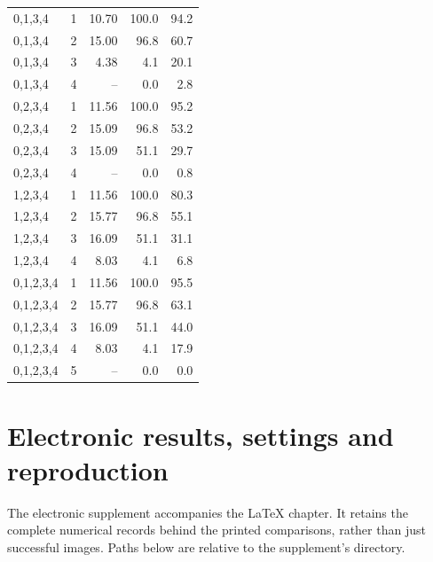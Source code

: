 \begin{longtable}{@{}lrrrr@{}}
0,1,3,4 & 1 & 10.70 & 100.0 & 94.2\\
0,1,3,4 & 2 & 15.00 & 96.8 & 60.7\\
0,1,3,4 & 3 & 4.38 & 4.1 & 20.1\\
0,1,3,4 & 4 & -- & 0.0 & 2.8\\
0,2,3,4 & 1 & 11.56 & 100.0 & 95.2\\
0,2,3,4 & 2 & 15.09 & 96.8 & 53.2\\
0,2,3,4 & 3 & 15.09 & 51.1 & 29.7\\
0,2,3,4 & 4 & -- & 0.0 & 0.8\\
1,2,3,4 & 1 & 11.56 & 100.0 & 80.3\\
1,2,3,4 & 2 & 15.77 & 96.8 & 55.1\\
1,2,3,4 & 3 & 16.09 & 51.1 & 31.1\\
1,2,3,4 & 4 & 8.03 & 4.1 & 6.8\\
0,1,2,3,4 & 1 & 11.56 & 100.0 & 95.5\\
0,1,2,3,4 & 2 & 15.77 & 96.8 & 63.1\\
0,1,2,3,4 & 3 & 16.09 & 51.1 & 44.0\\
0,1,2,3,4 & 4 & 8.03 & 4.1 & 17.9\\
0,1,2,3,4 & 5 & -- & 0.0 & 0.0\\
\bottomrule\end{longtable}\endgroup


\section{Electronic results, settings and reproduction}
\label{saftapp:reproduction}
The electronic supplement accompanies the LaTeX chapter. It retains the complete numerical records behind the printed comparisons, rather than just successful images. Paths below are relative to the supplement's  directory.

